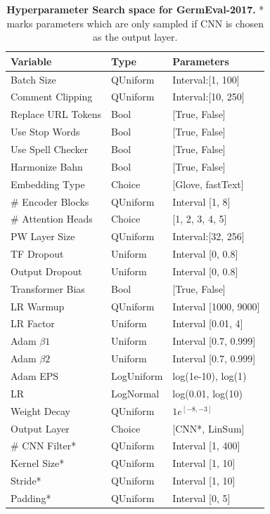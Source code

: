 \begin{table}[H]
    \centering
    \begin{tabular}{@{}lll@{}}
    \toprule
    Variable           & Type       & Parameters                \\ \midrule
    Batch Size         & QUniform   & Interval:{[}1, 100{]}    \\
    Comment Clipping   & QUniform   & Interval:{[}10, 250{]}   \\
    Replace URL Tokens & Bool       & {[}True, False{]}         \\
    Use Stop Words     & Bool       & {[}True, False{]}         \\
    Use Spell Checker  & Bool       & {[}True, False{]}         \\
    Harmonize Bahn     & Bool       & {[}True, False{]}         \\
    Embedding Type     & Choice     & {[}Glove, fastText{]}     \\
    \# Encoder Blocks  & QUniform   & Interval {[}1, 8{]}       \\
    \# Attention Heads & Choice     & {[}1, 2, 3, 4, 5{]}       \\
    PW Layer Size      & QUniform   & Interval:{[}32, 256{]}   \\
    TF Dropout         & Uniform    & Interval {[}0, 0.8{]}     \\
    Output Dropout     & Uniform    & Interval {[}0, 0.8{]}     \\
    Transformer Bias   & Bool       & {[}True, False{]}         \\
    LR Warmup          & QUniform   & Interval {[}1000, 9000{]} \\
    LR Factor          & Uniform    & Interval {[}0.01, 4{]}    \\
    Adam $\beta 1$        & Uniform    & Interval {[}0.7, 0.999{]} \\
    Adam $\beta 2$        & Uniform    & Interval {[}0.7, 0.999{]} \\
    Adam EPS           & LogUniform & log(1e-10), log(1)        \\
    LR                 & LogNormal  & log(0.01, log(10)         \\
    Weight Decay       & QUniform   & $1e^{[-8, -3]}$       \\
    Output Layer       & Choice     & {[}CNN*, LinSum{]}        \\
    \# CNN Filter*     & QUniform   & Interval {[}1, 400{]}     \\
    Kernel Size*       & QUniform   & Interval {[}1, 10{]}      \\
    Stride*            & QUniform   & Interval {[}1, 10{]}      \\
    Padding*           & QUniform   & Interval {[}0, 5{]}       \\ \bottomrule
    \end{tabular}
    \caption{\textbf{Hyperparameter Search space for GermEval-2017.} * marks parameters which are only sampled if CNN is chosen as the output layer.}
    \label{tab:08_hpSpace}    
\end{table}

